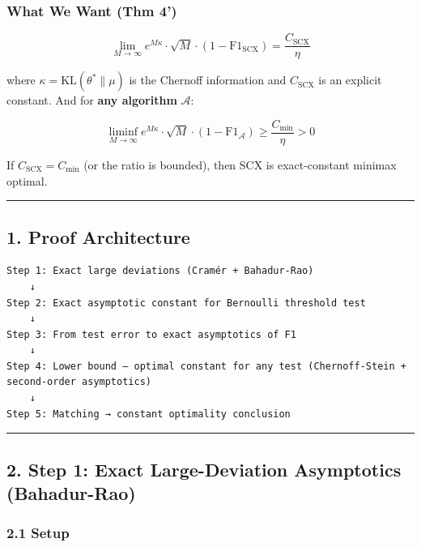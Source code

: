 \documentclass[
  12pt,
]{ctexart}
\begin{document}
\subsubsection{What We Want (Thm 4')}\label{what-we-want-thm-4-prime}

\[\lim_{M\to\infty} e^{M\kappa} \cdot \sqrt{M} \cdot (1 - \text{F1}_{\text{SCX}}) = \frac{C_{\text{SCX}}}{\eta}\]

where \(\kappa = \text{KL}(\theta^* \| \mu)\) is the Chernoff information and \(C_{\text{SCX}}\) is an explicit constant. And for \textbf{any algorithm} \(\mathcal{A}\):

\[\liminf_{M\to\infty} e^{M\kappa} \cdot \sqrt{M} \cdot (1 - \text{F1}_{\mathcal{A}}) \geq \frac{C_{\text{min}}}{\eta} > 0\]

If \(C_{\text{SCX}} = C_{\text{min}}\) (or the ratio is bounded), then SCX is exact-constant minimax optimal.

\begin{center}\rule{0.5\linewidth}{0.5pt}\end{center}

\subsection{1. Proof Architecture}\label{proof-architecture}

\begin{verbatim}
Step 1: Exact large deviations (Cramér + Bahadur-Rao)
    ↓
Step 2: Exact asymptotic constant for Bernoulli threshold test
    ↓
Step 3: From test error to exact asymptotics of F1
    ↓
Step 4: Lower bound — optimal constant for any test (Chernoff-Stein + second-order asymptotics)
    ↓
Step 5: Matching → constant optimality conclusion
\end{verbatim}

\begin{center}\rule{0.5\linewidth}{0.5pt}\end{center}

\subsection{2. Step 1: Exact Large-Deviation Asymptotics (Bahadur-Rao)}\label{step-1-exact-large-deviation-asymptotics-bahadur-rao}

\subsubsection{2.1 Setup}\label{setup}
\end{document}

